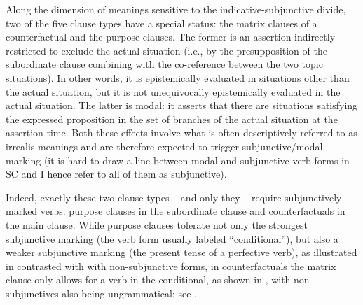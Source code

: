 \documentclass[output=paper]{langscibook}
\begin{document}
Along the dimension of meanings sensitive to the indicative-subjunctive divide, two of the five clause types have a special status: the matrix clauses of a counterfactual and the purpose clauses. The former is an assertion indirectly restricted to exclude the actual situation (i.e., by the presupposition of the subordinate clause combining with the co-reference between the two topic situations). In other words, it is epistemically evaluated in situations other than the actual situation, but it is not unequivocally epistemically evaluated in the actual situation. The latter is modal: it asserts that there are situations satisfying the expressed proposition in the set of branches of the actual situation at the assertion time. Both these effects involve what is often descriptively referred to as irrealis meanings \citep{Chung:1985} and are therefore expected to trigger subjunctive/modal marking (it is hard to draw a line between modal and subjunctive verb forms in SC and I hence refer to all of them as subjunctive).

Indeed, exactly these two clause types -- and only they -- require subjunctively marked verbs: purpose clauses in the subordinate clause and counterfactuals in the main clause. While purpose clauses tolerate not only the strongest subjunctive marking (the verb form usually labeled ``conditional''), but also a weaker subjunctive marking (the present tense of a perfective verb), as illustrated in  contrasted with  with non-subjunctive forms, in counterfactuals the matrix clause only allows for a verb in the conditional, as shown in , with non-subjunctives also being ungrammatical; see .

\ea\label{ex:Final-verb}
\label{ex:Final-verb-a}
\label{ex:Final-verb-b}
\label{ex:Counter-verb-a}
\label{ex:Counter-verb-b}
\z\z
\end{document}
